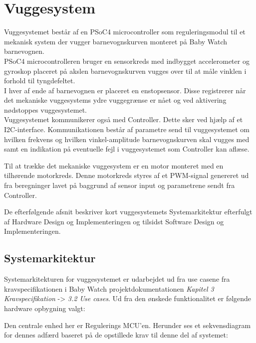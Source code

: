 \chapter{Vuggesystem}
\label{vuggesys}
Vuggesystemet består af en PSoC4 microcontroller som reguleringsmodul til et mekanisk system der vugger barnevognskurven monteret på Baby Watch barnevognen. \\ PSoC4 microcontrolleren bruger en sensorkreds med indbygget accelerometer og gyroskop placeret på akslen barnevognskurven vugges over til at måle vinklen i forhold til tyngdefeltet. \\ I hver af ende af barnevognen er placeret en enstopsensor. Disse registrerer når det mekaniske vuggesystems ydre vuggegrænse er nået og ved aktivering nødstoppes vuggesystemet. \\ Vuggesystemet kommunikerer også med Controller. Dette sker ved hjælp af et I2C-interface. Kommunikationen består af parametre send til vuggesystemet om hvilken frekvens og hvilken vinkel-amplitude barnevognskurven skal vugges med samt en indikation på eventuelle fejl i vuggesystemet som Controller kan aflæse.

Til at trække det mekaniske vuggesystem er en motor monteret med en tilhørende motorkreds. Denne motorkreds styres af et PWM-signal genereret ud fra beregninger lavet på baggrund af sensor input og parametrene sendt fra Controller.

De efterfølgende afsnit beskriver kort vuggesystemets Systemarkitektur efterfulgt af Hardware Design og Implementeringen og tilsidst Software Design og Implementeringen.

\section{Systemarkitektur}
\label{vs_sysark}
Systemarkitekturen for vuggesystemet er udarbejdet ud fra use casene fra kravspecifikationen i Baby Watch projektdokumentationen \textit{Kapitel 3 Kravspecifikation} -> \textit{3.2 Use cases}. Ud fra den ønskede funktionalitet er følgende hardware opbygning valgt:


Den centrale enhed her er Regulerings MCU'en. Herunder ses et sekvensdiagram for dennes adfærd baseret på de opstillede krav til denne del af systemet:


